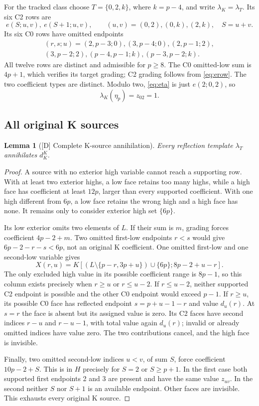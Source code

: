 \documentclass[11pt]{article}
\newtheorem{lemma}[theorem]{Lemma}
\theoremstyle{definition}
\theoremstyle{remark}
\begin{document}
For the tracked class choose $T=\{0,2,k\}$, where $k=p-4$, and write
$\lambda_K=\lambda_T$. Its six C2 rows are
\[
 e(S;u,v),\ e(S+1;u,v),\qquad
 (u,v)=(0,2),(0,k),(2,k),\quad S=u+v.
\]
Its six C0 rows have omitted endpoints
\begin{equation}\label{eq:twelveC0}
 \begin{gathered}
 (r,s;u)=(2,p-3;0),(3,p-4;0),(2,p-1;2),\\
 (3,p-2;2),(p-4,p-1;k),(p-3,p-2;k).
 \end{gathered}
\end{equation}
All twelve rows are distinct and admissible for $p\geq8$. The C0
omitted-low sum is $4p+1$, which verifies its target grading; C2 grading
follows from \eqref{eq:erow}. The two coefficient types are distinct.
Modulo two, \eqref{eq:eta} is just $e(2;0,2)$, so
\begin{equation}\label{eq:eta-pairing}
 \lambda_K(\eta_p)=z_{02}=1.
\end{equation}

\subsection{All original K sources}

\begin{lemma}[{[D]} Complete K-source annihilation]\label{lem:Kparity}
Every reflection template $\lambda_T$ annihilates $d_K^K$.
\end{lemma}
\begin{proof}
A source with no exterior high variable cannot reach a supporting row.
With at least two exterior highs, a low face retains too many highs,
while a high face has coefficient at least $12p$, larger than every
supported coefficient. With one high different from $6p$, a low face
retains the wrong high and a high face has none. It remains only to
consider exterior high set $\{6p\}$.

Its low exterior omits two elements of $L$. If their sum is $m$, grading
forces coefficient $4p-2+m$. Two omitted first-low endpoints $r<s$
would give $6p-2-r-s<6p$, not an original K coefficient.
One omitted first-low and one second-low variable gives
\[
 X(r,u)=K[(L\setminus\{p-r,3p+u\})\cup\{6p\};8p-2+u-r].
\]
The only excluded high value in its possible coefficient range is $8p-1$,
so this column exists precisely when $r\geq u$ or $r\leq u-2$.
If $r\leq u-2$, neither supported C2 endpoint is possible and the
other C0 endpoint would exceed $p-1$. If $r\geq u$, its possible
C0 face has reflected endpoint $s=p+u-1-r$ and value $d_u(r)$.
At $s=r$ the face is absent but its assigned value is zero. Its C2
faces have second indices $r-u$ and $r-u-1$, with total value again
$d_u(r)$; invalid or already omitted indices have value zero.
The two contributions cancel, and the high face is invisible.

Finally, two omitted second-low indices $u<v$, of sum $S$, force
coefficient $10p-2+S$. This is in $H$ precisely for $S=2$ or
$S\geq p+1$. In the first case both supported first endpoints 2 and
3 are present and have the same value $z_{uv}$. In the second neither
$S$ nor $S+1$ is an available endpoint. Other faces are invisible.
This exhausts every original K source.
\end{proof}
\end{document}
